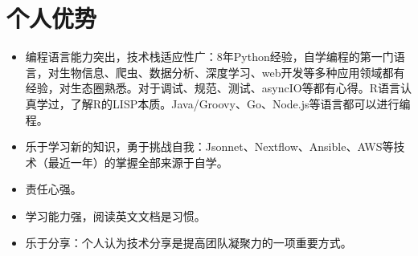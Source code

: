 \documentclass{resume}
\begin{document}
\section{个人优势}
\begin{itemize}[parsep=0.2ex]
  \item 编程语言能力突出，技术栈适应性广：8年Python经验，自学编程的第一门语言，对生物信息、爬虫、数据分析、深度学习、web开发等多种应用领域都有经验，对生态圈熟悉。对于调试、规范、测试、asyncIO等都有心得。R语言认真学过，了解R的LISP本质。Java/Groovy、Go、Node.js等语言都可以进行编程。
  \item 乐于学习新的知识，勇于挑战自我：Jsonnet、Nextflow、Ansible、AWS等技术（最近一年）的掌握全部来源于自学。
  \item 责任心强。
  \item 学习能力强，阅读英文文档是习惯。
  \item 乐于分享：个人认为技术分享是提高团队凝聚力的一项重要方式。

\end{itemize}

\end{document}
